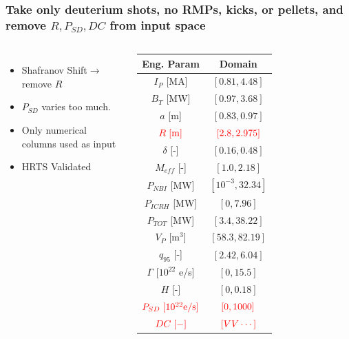 \documentclass{beamer}
\begin{document}
\begin{frame}
\frametitle{Take only deuterium shots, no RMPs, kicks, or pellets, and remove $R, P_{SD}, DC$ from input space}
\begin{columns}
\begin{itemize}
	\item Shafranov Shift$\rightarrow$ remove $R$
	\item $P_{SD}$ varies too much. 
	\item Only numerical columns used as input
	\item HRTS Validated 
\end{itemize}

\begin{tabular}{| c | c | }
	\hline
	Eng. Param & Domain \\
	\hline
	$I_P$ [MA] & $[0.81, 4.48]$ \\
	$B_T$ [MW] & $[0.97, 3.68]$ \\
	$a$ [m] & $[0.83, 0.97]$ \\
	\sout{$\color{red}R \; \text{[m]}$ } & \sout{$ \color{red}[2.8, 2.975]$} \\ 
	$\delta$ [-] & $[0.16, 0.48]$ \\
	$M_{eff}$ [-] & $[1.0, 2.18]$ \\
	$P_{NBI}$ [MW] & $[10^{-3}, 32.34]$ \\
	$P_{ICRH}$ [MW] & $[0, 7.96]$ \\
	$P_{TOT}$ [MW] & $[3.4, 38.22]$ \\
	$V_P$ [m$^3$] &  $[58.3, 82.19]$ \\
	$q_{95}$ [-] & $[2.42, 6.04]$ \\
	$\Gamma$ [$10^{22}$ e/s] & $[0, 15.5]$ \\
	$H$ [-] & $[0, 0.18]$ \\
	\sout{$\color{red} P_{SD} \; [10^{22} \text{e/s}]$} & \sout{$\color{red} [0, 1000]$} \\
	\sout{$\color{red}DC \; [-]$ } & \sout{$\color{red}[VV \cdots]$} \\
	\hline
\end{tabular}

\end{columns}
\end{frame}
\end{document}
